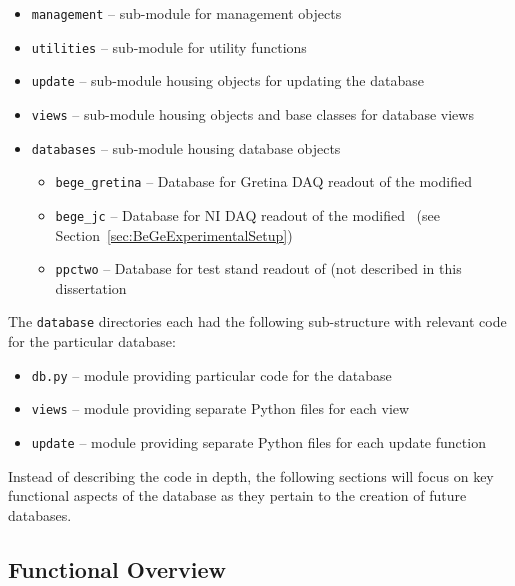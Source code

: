 			\lstset{language=sh}
			\begin{itemize}
		  	  	\setlength{\itemsep}{0.5pt}
		  	  	\setlength{\parskip}{0pt}
		  	  	\setlength{\parsep}{0pt}
				\item[] \lstinline!management! -- sub-module for management objects 
				\item[] \lstinline!utilities! -- sub-module for utility functions 
				\item[] \lstinline!update! -- sub-module housing objects for updating the database 
				\item[] \lstinline!views! -- sub-module housing objects and base classes for database views 
				\item[] \lstinline!databases! -- sub-module housing database objects 
				\begin{itemize}
		  	  		\setlength{\itemsep}{0.5pt}
		  	  		\setlength{\parskip}{0pt}
		  	  		\setlength{\parsep}{0pt}
					\item[] \lstinline!bege_gretina! -- Database for Gretina DAQ readout of the modified \bege
					\item[] \lstinline!bege_jc! -- Database for NI DAQ readout of the modified \bege~(see Section~\ref{sec:BeGeExperimentalSetup}) 
					\item[] \lstinline!ppctwo! -- Database for test stand readout of  (not described in this dissertation 
				\end{itemize}
			\end{itemize}
The \lstinline!database! directories each had the following sub-structure with relevant code for the particular database:
			\begin{itemize}
		  	  	\setlength{\itemsep}{0.5pt}
		  	  	\setlength{\parskip}{0pt}
		  	  	\setlength{\parsep}{0pt}
				\item[] \lstinline!db.py! -- module providing particular code for the database 
				\item[] \lstinline!views! -- module providing separate Python files for each view 
				\item[] \lstinline!update! -- module providing separate Python files for each update function 
			\end{itemize}
	
Instead of describing the code in
depth, the following sections will focus on key functional aspects of the
database as they pertain to the creation of future databases.  

		\subsection{Functional Overview}
		
